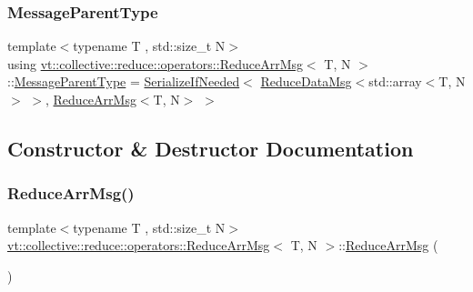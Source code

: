 \mbox{\label{structvt_1_1collective_1_1reduce_1_1operators_1_1_reduce_arr_msg_a30910931cccfb82bd2eefd37c8292caa}} 
\subsubsection{\texorpdfstring{Message\+Parent\+Type}{MessageParentType}}
{\footnotesize\ttfamily template$<$typename T , std\+::size\+\_\+t N$>$ \\
using \hyperlink{structvt_1_1collective_1_1reduce_1_1operators_1_1_reduce_arr_msg}{vt\+::collective\+::reduce\+::operators\+::\+Reduce\+Arr\+Msg}$<$ T, N $>$\+::\hyperlink{structvt_1_1collective_1_1reduce_1_1operators_1_1_reduce_arr_msg_a30910931cccfb82bd2eefd37c8292caa}{Message\+Parent\+Type} =  \hyperlink{namespacevt_a0a4ad8c256fcffa564e9fa7800e4b495}{Serialize\+If\+Needed}$<$ \hyperlink{structvt_1_1collective_1_1reduce_1_1operators_1_1_reduce_data_msg}{Reduce\+Data\+Msg}$<$std\+::array$<$T, N$>$ $>$, \hyperlink{structvt_1_1collective_1_1reduce_1_1operators_1_1_reduce_arr_msg}{Reduce\+Arr\+Msg}$<$T, N$>$ $>$}



\subsection{Constructor \& Destructor Documentation}
\mbox{\label{structvt_1_1collective_1_1reduce_1_1operators_1_1_reduce_arr_msg_a3b3aa1ecb078b1c733a81cd79be27e00}} 
\subsubsection{\texorpdfstring{Reduce\+Arr\+Msg()}{ReduceArrMsg()}\hspace{0.1cm}{\footnotesize\ttfamily [1/3]}}
{\footnotesize\ttfamily template$<$typename T , std\+::size\+\_\+t N$>$ \\
\hyperlink{structvt_1_1collective_1_1reduce_1_1operators_1_1_reduce_arr_msg}{vt\+::collective\+::reduce\+::operators\+::\+Reduce\+Arr\+Msg}$<$ T, N $>$\+::\hyperlink{structvt_1_1collective_1_1reduce_1_1operators_1_1_reduce_arr_msg}{Reduce\+Arr\+Msg} (\begin{DoxyParamCaption}{ }\end{DoxyParamCaption})\hspace{0.3cm}{\ttfamily [default]}}

